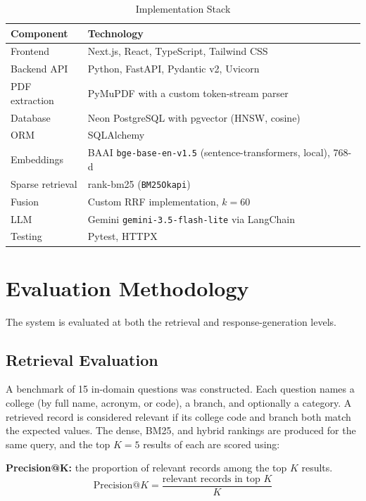 \documentclass[conference]{IEEEtran}
\begin{document}
\begin{table}[!t]
\centering
\caption{Implementation Stack}
\label{tab:stack}
\footnotesize
\renewcommand{\arraystretch}{1.1}
\begin{tabularx}{\columnwidth}{@{}L{2.3cm}Y@{}}
\toprule
\textbf{Component} & \textbf{Technology} \\
\midrule
Frontend & Next.js, React, TypeScript, Tailwind CSS \\
Backend API & Python, FastAPI, Pydantic v2, Uvicorn \\
PDF extraction & PyMuPDF with a custom token-stream parser \\
Database & Neon PostgreSQL with pgvector (HNSW, cosine) \\
ORM & SQLAlchemy \\
Embeddings & BAAI \texttt{bge-base-en-v1.5} (sentence-transformers, local), 768-d \\
Sparse retrieval & rank-bm25 (\texttt{BM25Okapi}) \\
Fusion & Custom RRF implementation, $k=60$ \\
LLM & Gemini \texttt{gemini-3.5-flash-lite} via LangChain \\
Testing & Pytest, HTTPX \\
\bottomrule
\end{tabularx}
\end{table}

\section{Evaluation Methodology}

The system is evaluated at both the retrieval and
response-generation levels.

\subsection{Retrieval Evaluation}

A benchmark of 15 in-domain questions was constructed. Each
question names a college (by full name, acronym, or code), a
branch, and optionally a category. A retrieved record is considered
relevant if its college code and branch both match the expected
values. The dense, BM25, and hybrid rankings are produced for the
same query, and the top $K=5$ results of each are scored using:

\textbf{Precision@K:} the proportion of relevant records among the
top $K$ results.
\begin{equation}
\mathrm{Precision@}K =
\frac{\text{relevant records in top } K}{K}
\end{equation}
\end{document}
